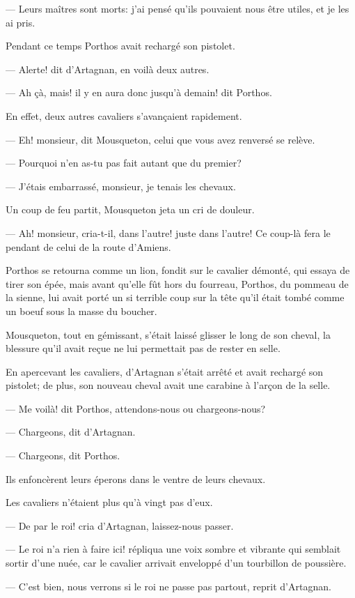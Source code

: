 — Leurs maîtres sont morts: j'ai pensé qu'ils pouvaient nous être utiles, et je les ai pris.

Pendant ce temps Porthos avait rechargé son pistolet.

— Alerte! dit d'Artagnan, en voilà deux autres.

— Ah çà, mais! il y en aura donc jusqu'à demain! dit Porthos.

En effet, deux autres cavaliers s'avançaient rapidement.

— Eh! monsieur, dit Mousqueton, celui que vous avez renversé se relève.

— Pourquoi n'en as-tu pas fait autant que du premier?

— J'étais embarrassé, monsieur, je tenais les chevaux.

Un coup de feu partit, Mousqueton jeta un cri de douleur.

— Ah! monsieur, cria-t-il, dans l'autre! juste dans l'autre! Ce coup-là fera le pendant de celui de la route d'Amiens.

Porthos se retourna comme un lion, fondit sur le cavalier démonté, qui essaya de tirer son épée, mais avant qu'elle fût hors du fourreau, Porthos, du pommeau de la sienne, lui avait porté un si terrible coup sur la tête qu'il était tombé comme un boeuf sous la masse du boucher.

Mousqueton, tout en gémissant, s'était laissé glisser le long de son cheval, la blessure qu'il avait reçue ne lui permettait pas de rester en selle.

En apercevant les cavaliers, d'Artagnan s'était arrêté et avait rechargé son pistolet; de plus, son nouveau cheval avait une carabine à l'arçon de la selle.

— Me voilà! dit Porthos, attendons-nous ou chargeons-nous?

— Chargeons, dit d'Artagnan.

— Chargeons, dit Porthos.

Ils enfoncèrent leurs éperons dans le ventre de leurs chevaux.

Les cavaliers n'étaient plus qu'à vingt pas d'eux.

— De par le roi! cria d'Artagnan, laissez-nous passer.

— Le roi n'a rien à faire ici! répliqua une voix sombre et vibrante qui semblait sortir d'une nuée, car le cavalier arrivait enveloppé d'un tourbillon de poussière.

— C'est bien, nous verrons si le roi ne passe pas partout, reprit d'Artagnan.

